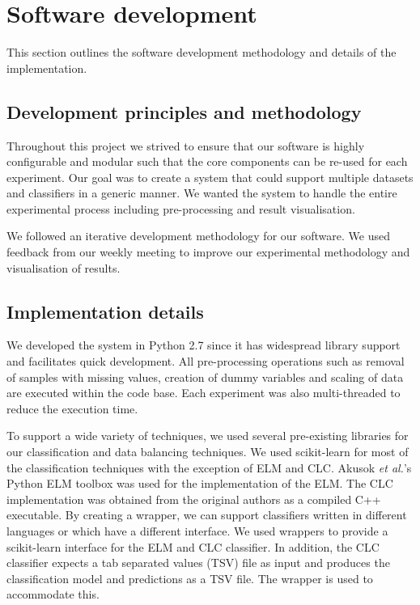 \documentclass{sig-alternate-05-2015}
\begin{document}
	\section{Software development}
	This section outlines the software development methodology and details of the implementation.
	\subsection{Development principles and methodology}
	Throughout this project we strived to ensure that our software is highly configurable and modular such that the core components can be re-used for each experiment. Our goal was to create a system that could support multiple datasets and classifiers in a generic manner. We wanted the system to handle the entire experimental process including pre-processing and result visualisation.
	
	We followed an iterative development methodology for our software. We used feedback from our weekly meeting to improve our experimental methodology and visualisation of results.
	
	\subsection{Implementation details}
	We developed the system in Python 2.7 since it has widespread library support and facilitates quick development. All pre-processing operations such as removal of samples with missing values, creation of dummy variables and scaling of data are executed within the code base. Each experiment was also multi-threaded to reduce the execution time.
	
	To support a wide variety of techniques, we used several pre-existing libraries for our classification and data balancing techniques. We used scikit-learn \cite{scikit-learn} for most of the classification techniques with the exception of ELM and CLC. Akusok \textit{et al.}'s \cite{7140733} Python ELM toolbox was used for the implementation of the ELM. The CLC implementation was obtained from the original authors \cite{Chen2006} as a compiled C++ executable. By creating a wrapper, we can support classifiers written in different languages or which have a different interface. We used wrappers to provide a scikit-learn interface for the ELM and CLC classifier. In addition, the CLC classifier expects a tab separated values (TSV) file as input and produces the classification model and predictions as a TSV file. The wrapper is used to accommodate this.
	
\end{document}
